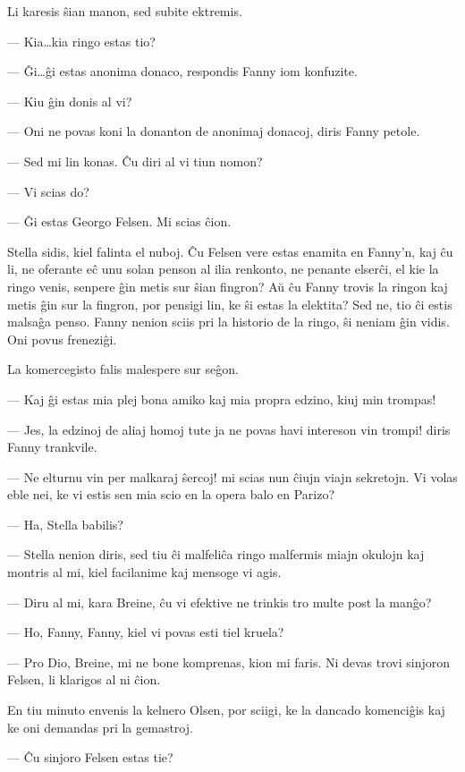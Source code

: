    Li karesis \^sian manon, sed subite ektremis.

 --- Kia\dots kia ringo estas tio?

 --- \^Gi\dots \^gi estas anonima donaco, respondis Fanny iom konfuzite.

 --- Kiu \^gin donis al vi?

 --- Oni ne povas koni la donanton de anonimaj donacoj, diris Fanny
petole.

 --- Sed mi lin konas. \^Cu diri al vi tiun nomon?

 --- Vi scias do?

 --- \^Gi estas Georgo Felsen. Mi scias \^cion.

   Stella sidis, kiel falinta el nuboj. \^Cu Felsen vere estas enamita en
Fanny'n, kaj \^cu li, ne oferante e\^c unu solan penson al ilia
renkonto, ne penante elser\^ci, el kie la ringo venis, senpere \^gin
metis sur \^sian fingron? A\u u \^cu Fanny trovis la ringon kaj
metis \^gin sur la fingron, por pensigi lin, ke \^si estas la
elektita? Sed ne, tio \^ci estis malsa\^ga penso. Fanny nenion sciis
pri la historio de la ringo, \^si neniam \^gin vidis. Oni povus
frenezi\^gi.

   La komercegisto falis malespere sur se\^gon.

 --- Kaj \^gi estas mia plej bona amiko kaj mia propra edzino, kiuj min
trompas!

 --- Jes, la edzinoj de aliaj homoj tute ja ne povas havi intereson vin
trompi! diris Fanny trankvile.

 --- Ne elturnu vin per malkaraj \^sercoj! mi scias nun \^ciujn viajn
sekretojn. Vi volas eble nei, ke vi estis sen mia scio en la opera
balo en Parizo?

 --- Ha, Stella babilis?

 --- Stella nenion diris, sed tiu \^ci malfeli\^ca ringo malfermis miajn
okulojn kaj montris al mi, kiel facilanime kaj mensoge vi agis.

 --- Diru al mi, kara Breine, \^cu vi efektive ne trinkis tro multe post
la man\^go?

 --- Ho, Fanny, Fanny, kiel vi povas esti tiel kruela?

 --- Pro Dio, Breine, mi ne bone komprenas, kion mi faris. Ni devas
trovi sinjoron Felsen, li klarigos al ni \^cion.

   En tiu minuto envenis la kelnero Olsen, por sciigi, ke la dancado
ko\-men\-ci\-\^gis kaj ke oni demandas pri la gemastroj.

 --- \^Cu sinjoro Felsen estas tie?

